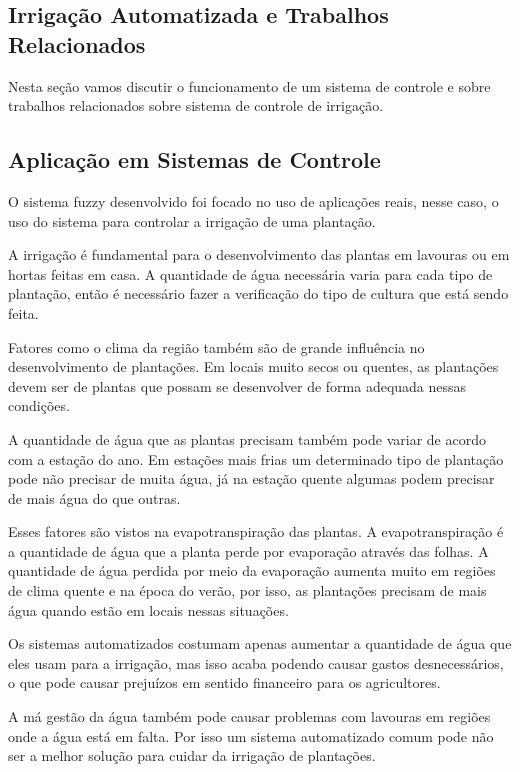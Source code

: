 \documentclass[
	article,			%
	11pt,				%
	oneside,			%
	a4paper,			%
	english,			%
	brazil,				%
	sumario=tradicional
	]{abntex2}
\begin{document}
\begin{multicols}{2}
\section{Irrigação Automatizada e Trabalhos Relacionados}

Nesta seção vamos discutir o funcionamento de um sistema de controle e sobre trabalhos relacionados sobre sistema de controle de irrigação.

\subsection{Aplicação em Sistemas de Controle}

O sistema fuzzy desenvolvido foi focado no uso de aplicações reais, nesse caso, o uso do sistema para controlar a irrigação de uma plantação.

A irrigação é fundamental para o desenvolvimento das plantas em lavouras ou em hortas feitas em casa. A quantidade de água necessária varia para cada tipo de plantação, então é necessário fazer a verificação do tipo de cultura que está sendo feita.

Fatores como o clima da região também são de grande influência no desenvolvimento de plantações. Em locais muito secos ou quentes, as plantações devem ser de plantas que possam se desenvolver de forma adequada nessas condições.

A quantidade de água que as plantas precisam também pode variar de acordo com a estação do ano. Em estações mais frias um determinado tipo de plantação pode não precisar de muita água, já na estação quente algumas podem precisar de mais água do que outras.

Esses fatores são vistos na evapotranspiração das plantas. A evapotranspiração é a quantidade de água que a planta perde por evaporação através das folhas. A quantidade de água perdida por meio da evaporação aumenta muito em regiões de clima quente e na época do verão, por isso, as plantações precisam de mais água quando estão em locais nessas situações.

Os sistemas automatizados costumam apenas aumentar a quantidade de água que eles usam para a irrigação, mas isso acaba podendo causar gastos desnecessários, o que pode causar prejuízos em sentido financeiro para os agricultores.

A má gestão da água também pode causar problemas com lavouras em regiões onde a água está em falta. Por isso um sistema automatizado comum pode não ser a melhor solução para cuidar da irrigação de plantações.


\end{multicols}
\end{document}
